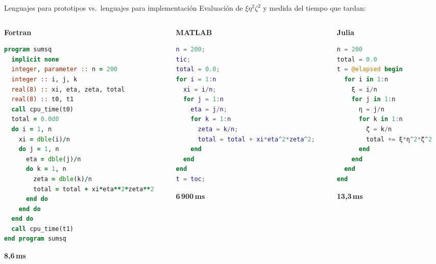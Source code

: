\documentclass{beamer}
\begin{document}
\begin{frame}[fragile]{Lenguajes para prototipos vs.\ lenguajes para implementación}
  \vspace{0.3cm}
  Evaluación de $\xi\eta^2\zeta^2$ y medida del tiempo que tardan:
  \vspace{0.1cm}

  \begin{columns}[t]
    \begin{column}{0.36\textwidth}
      \textbf{\color{craneblue}Fortran}
      \begin{lstlisting}[language=Fortran,basicstyle=\ttfamily\fontsize{5.5}{6}\selectfont]
program sumsq
  implicit none
  integer, parameter :: n = 200
  integer :: i, j, k
  real(8) :: xi, eta, zeta, total
  real(8) :: t0, t1
  call cpu_time(t0)
  total = 0.0d0
  do i = 1, n
    xi = dble(i)/n
    do j = 1, n
      eta = dble(j)/n
      do k = 1, n
        zeta = dble(k)/n
        total = total + xi*eta**2*zeta**2
      end do
    end do
  end do
  call cpu_time(t1)
end program sumsq
\end{lstlisting}
      \vspace{0.05cm}
      \centering\textbf{8{,}6\,ms}
    \end{column}
    \begin{column}{0.30\textwidth}
      \textbf{\color{craneblue}MATLAB}
      \begin{lstlisting}[language=Matlab,basicstyle=\ttfamily\fontsize{5.5}{6}\selectfont]
n = 200;
tic;
total = 0.0;
for i = 1:n
  xi = i/n;
  for j = 1:n
    eta = j/n;
    for k = 1:n
      zeta = k/n;
      total = total + xi*eta^2*zeta^2;
    end
  end
end
t = toc;
\end{lstlisting}
      \vspace{0.05cm}
      \centering\textbf{6\,900\,ms}
    \end{column}
    \begin{column}{0.30\textwidth}
      \textbf{\color{craneblue}Julia}
      \begin{lstlisting}[language=Julia,basicstyle=\ttfamily\fontsize{5.5}{6}\selectfont]
n = 200
total = 0.0
t = @elapsed begin
  for i in 1:n
    ξ = i/n
    for j in 1:n
      η = j/n
      for k in 1:n
        ζ = k/n
        total += ξ*η^2*ζ^2
      end
    end
  end
end
\end{lstlisting}
      \vspace{0.05cm}
      \centering\textbf{13{,}3\,ms}
    \end{column}
  \end{columns}
\end{frame}
\end{document}
